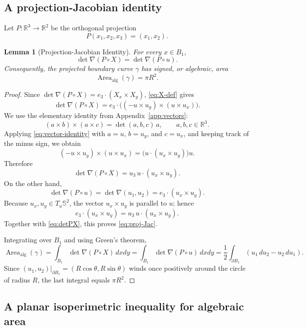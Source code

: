 \documentclass[11pt]{amsart}
\numberwithin{equation}{section}
\newtheorem{lemma}[theorem]{Lemma}
\theoremstyle{remark}
\newcommand{\R}{\mathbb{R}}
\newcommand{\Sph}{\mathbb{S}^2}
\newcommand{\AlgArea}{\operatorname{Area}_{\mathrm{alg}}}
\begin{document}
\subsection{A projection-Jacobian identity}

Let $P\colon\R^3\to\R^2$ be the orthogonal projection
\[
P(x_1,x_2,x_3)=(x_1,x_2).
\]

\begin{lemma}[Projection-Jacobian Identity]\label{lem:projection-jacobian}
For every $x\in B_1$,
\begin{equation}\label{eq:proj-Jac}
\det\nabla(P\circ X)=\det\nabla(P\circ u).
\end{equation}
Consequently, the projected boundary curve $\gamma$ has signed, or algebraic, area
\[
\AlgArea(\gamma)=\pi R^2.
\]
\end{lemma}

\begin{proof}
Since $\det\nabla(P\circ X)=e_3\cdot(X_x\times X_y)$, \eqref{eq:X-def} gives
\[
\det\nabla(P\circ X)
=e_3\cdot\bigl((-u\times u_y)\times(u\times u_x)\bigr).
\]
We use the elementary identity from Appendix~\ref{app:vectors}:
\begin{equation}\label{eq:vector-identity}
(a\times b)\times(a\times c)=\det(a,b,c)\,a,
\qquad a,b,c\in\R^3.
\end{equation}
Applying \eqref{eq:vector-identity} with $a=u$, $b=u_y$, and $c=u_x$, and keeping track of the minus sign, we obtain
\[
(-u\times u_y)\times(u\times u_x)=\bigl(u\cdot(u_x\times u_y)\bigr)u.
\]
Therefore
\begin{equation}\label{eq:detPX}
\det\nabla(P\circ X)=u_3\,u\cdot(u_x\times u_y).
\end{equation}
On the other hand,
\[
\det\nabla(P\circ u)=\det\nabla(u_1,u_2)=e_3\cdot(u_x\times u_y).
\]
Because $u_x,u_y\in T_u\Sph$, the vector $u_x\times u_y$ is parallel to $u$; hence
\[
e_3\cdot(u_x\times u_y)=u_3\,u\cdot(u_x\times u_y).
\]
Together with \eqref{eq:detPX}, this proves \eqref{eq:proj-Jac}.

Integrating over $B_1$ and using Green's theorem,
\[
\AlgArea(\gamma)=\int_{B_1}\det\nabla(P\circ X)\,dxdy
=\int_{B_1}\det\nabla(P\circ u)\,dxdy
=\frac12\int_{\partial B_1}(u_1\,du_2-u_2\,du_1).
\]
Since $(u_1,u_2)|_{\partial B_1}=(R\cos\theta,R\sin\theta)$ winds once positively around the circle of radius $R$, the last integral equals
$\pi R^2$.
\end{proof}

\subsection{A planar isoperimetric inequality for algebraic area}
\end{document}
